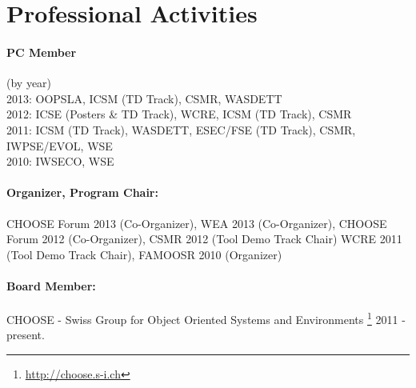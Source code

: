 \documentclass[a4paper]{article}
\newcommand{\longcv}[1]{#1}
\newcommand{\shortcv}[1]{}
\newcommand{\longcv}[1]{}
\newcommand{\shortcv}[1]{#1}
\begin{document}
\longcv{\section{Professional Activities}}
\shortcv{\section{Selected Professional Activities}}

\shortcv{
\paragraph{Journal Reviewer:}
Journal of Software Maintenance and Evolution, %
Empirical Software Engineering, %
Elsevier Journal of Systems and Software,
Elsevier Science of Computer Programming, %
Foundations and Trends in Human Computer Interaction %
}

\longcv{
}

\paragraph{PC Member} 
(by year) \\
2013: OOPSLA, ICSM (TD Track), CSMR, WASDETT \\
2012: ICSE (Posters \& TD Track), WCRE, ICSM (TD Track), CSMR \\
2011: ICSM (TD Track), WASDETT, ESEC/FSE (TD Track), CSMR, IWPSE/EVOL, WSE  \\
2010: IWSECO, WSE

\paragraph{Organizer, Program Chair:}
CHOOSE Forum 2013 (Co-Organizer),
WEA 2013 (Co-Organizer),
CHOOSE Forum 2012 (Co-Organizer),
CSMR 2012 (Tool Demo Track Chair)
WCRE 2011 (Tool Demo Track Chair), 
FAMOOSR 2010 (Organizer)

\paragraph{Board Member:}
CHOOSE - Swiss Group for Object Oriented Systems and Environments \footnote{\url{http://choose.s-i.ch}} 2011 - present.
\end{document}
